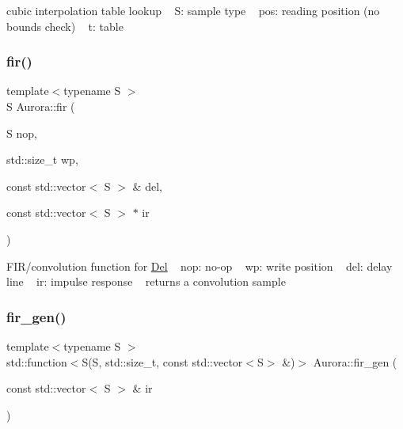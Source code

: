 cubic interpolation table lookup ~\newline
S\+: sample type ~\newline
pos\+: reading position (no bounds check) ~\newline
t\+: table \mbox{\label{namespace_aurora_aa192a550af8daa02ad2ee172339ba0d9}} 
\subsubsection{\texorpdfstring{fir()}{fir()}}
{\footnotesize\ttfamily template$<$typename S $>$ \\
S Aurora\+::fir (\begin{DoxyParamCaption}\item[{S}]{nop,  }\item[{std\+::size\+\_\+t}]{wp,  }\item[{const std\+::vector$<$ S $>$ \&}]{del,  }\item[{const std\+::vector$<$ S $>$ $\ast$}]{ir }\end{DoxyParamCaption})\hspace{0.3cm}{\ttfamily [inline]}}

F\+I\+R/convolution function for \hyperlink{class_aurora_1_1_del}{Del} ~\newline
nop\+: no-\/op ~\newline
wp\+: write position ~\newline
del\+: delay line ~\newline
ir\+: impulse response ~\newline
returns a convolution sample \mbox{\label{namespace_aurora_abf3b452f54db43f366b261c3702b0c0b}} 
\subsubsection{\texorpdfstring{fir\+\_\+gen()}{fir\_gen()}}
{\footnotesize\ttfamily template$<$typename S $>$ \\
std\+::function$<$S(S, std\+::size\+\_\+t, const std\+::vector$<$S$>$ \&)$>$ Aurora\+::fir\+\_\+gen (\begin{DoxyParamCaption}\item[{const std\+::vector$<$ S $>$ \&}]{ir }\end{DoxyParamCaption})}

